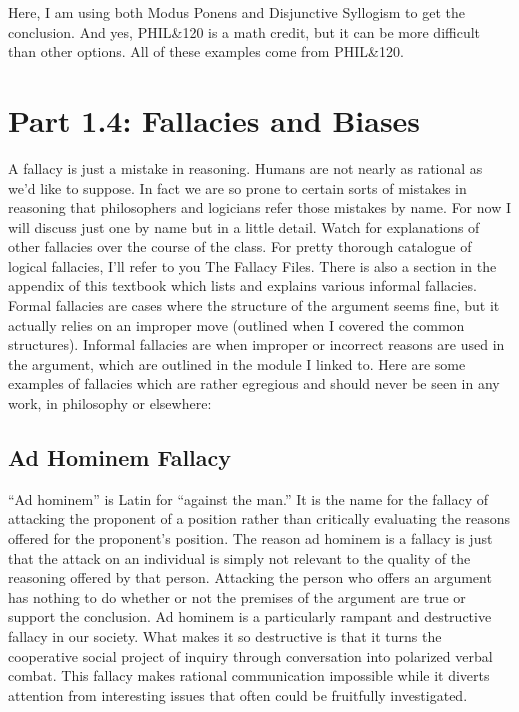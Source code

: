 Here, I am using both Modus Ponens and Disjunctive Syllogism to get the conclusion. And yes, PHIL\&120 is a math credit, but it can be more difficult than other options. All of these examples come from PHIL\&120. 

\section{Part 1.4: Fallacies and Biases}
\label{s:p1.4}

A fallacy is just a mistake in reasoning. Humans are not nearly as rational as we’d like to suppose. In fact we are so prone to certain sorts of mistakes in reasoning that philosophers and logicians refer those mistakes by name. For now I will discuss just one by name but in a little detail. Watch for explanations of other fallacies over the course of the class. For pretty thorough catalogue of logical fallacies, I’ll refer to you The Fallacy Files.\autocite{Curtis1} There is also a section in the appendix of this textbook which lists and explains various informal fallacies. Formal fallacies are cases where the structure of the argument seems fine, but it actually relies on an improper move (outlined when I covered the common structures). Informal fallacies are when improper or incorrect reasons are used in the argument, which are outlined in the module I linked to. Here are some examples of fallacies which are rather egregious and should never be seen in any work, in philosophy or elsewhere: 
\subsection{Ad Hominem Fallacy}

“Ad hominem” is Latin for “against the man.” It is the name for the fallacy of attacking the proponent of a position rather than critically evaluating the reasons offered for the proponent’s position. The reason ad hominem is a fallacy is just that the attack on an individual is simply not relevant to the quality of the reasoning offered by that person. Attacking the person who offers an argument has nothing to do whether or not the premises of the argument are true or support the conclusion. Ad hominem is a particularly rampant and destructive fallacy in our society. What makes it so destructive is that it turns the cooperative social project of inquiry through conversation into polarized verbal combat. This fallacy makes rational communication impossible while it diverts attention from interesting issues that often could be fruitfully investigated.

